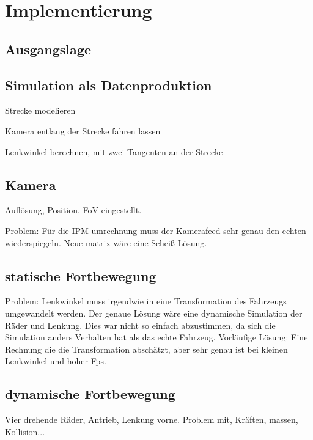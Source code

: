 
\chapter{Implementierung}

\section{Ausgangslage}

\section{Simulation als Datenproduktion}
Strecke modelieren

Kamera entlang der Strecke fahren lassen

Lenkwinkel berechnen, mit zwei Tangenten an der Strecke

\section{Kamera}
Auflösung, Position, FoV eingestellt.

Problem: Für die IPM umrechnung muss der Kamerafeed sehr genau den echten wiederspiegeln.
Neue matrix wäre eine Scheiß Lösung.


\section{statische Fortbewegung}
Problem: Lenkwinkel muss irgendwie in eine Transformation des Fahrzeugs umgewandelt werden.
Der genaue Lösung wäre eine dynamische Simulation der Räder und Lenkung.
Dies war nicht so einfach abzustimmen, da sich die Simulation anders Verhalten hat als das echte Fahrzeug.
Vorläufige Lösung: Eine Rechnung die die Transformation abschätzt, aber sehr genau ist bei kleinen Lenkwinkel und hoher Fps.

\section{dynamische Fortbewegung}
Vier drehende Räder, Antrieb, Lenkung vorne.
Problem mit, Kräften, massen, Kollision...